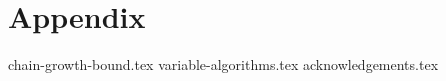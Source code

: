 \pagebreak
\section*{Appendix}

{chain-growth-bound.tex}
{variable-algorithms.tex}
\ifanonymous\else
{acknowledgements.tex}
\fi
